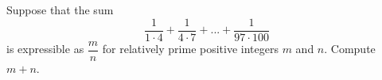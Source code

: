 Suppose that the sum $$\dfrac{1}{1 \cdot 4} +\dfrac{1}{4 \cdot 7}+ ...+\dfrac{1}{97 \cdot 100}$$is expressible as $\dfrac{m}{n}$ for relatively prime positive integers $m$ and $n$. Compute $m + n$.
